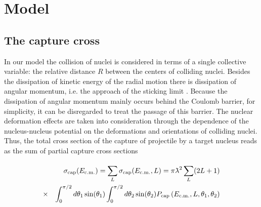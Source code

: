 \documentclass[preprint,review,12pt]{elsarticle}
\newcommand{\lambdabar}{{\mkern0.75mu\mathchar '26\mkern -9.75mu\lambda}}
\begin{document}
\newpage

\section{Model}
\subsection{The capture cross}
\label{1}
  In our model the collision of nuclei is considered in terms of a single collective variable: the relative
  distance $R$ between the centers of colliding nuclei.
  Besides the dissipation of kinetic energy of the radial motion there is dissipation of angular momentum, i.e. the approach of the sticking limit \cite{VVV,Schreder}.
  Because the dissipation of angular momentum mainly occurs behind the Coulomb barrier, for simplicity, it can be disregarded to treat the passage of this barrier.
  The nuclear deformation effects are taken into consideration through the dependence
  of the nucleus-nucleus potential on the deformations and
  orientations of colliding nuclei. Thus, the total cross section of the
  capture of projectile by a target nucleus reads as the sum of partial capture cross sections
 

  \begin{eqnarray}
  &&\sigma_{\rm cap}(E_{\rm c.m.})=\sum_{L}^{}\sigma_{\rm cap}(E_{\rm c.m.},L)=\pi\lambdabar^2 \sum_{L}(2L+1)  \nonumber\\
   &\times&  \int_0^{\pi/2}d\theta_1\sin(\theta_1)\int_0^{\pi/2}d\theta_2\sin(\theta_2)P_{\rm cap}\left(E_{\rm c.m.},L,\theta_1,\theta_2\right)
  \label{1a_eq}
  \end{eqnarray}
\end{document}
